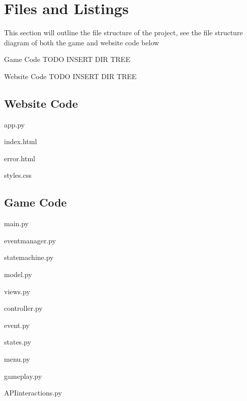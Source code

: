 \documentclass[a4paper, 11pt]{report}
\begin{document}
\section{Files and Listings}
This section will outline the file structure of the project, see the file structure diagram of both the game and website code below

\large{Game Code}
TODO INSERT DIR TREE


\large{Website Code}
TODO INSERT DIR TREE

\lstlistoflistings
\subsection{Website Code}

app.py


index.html


error.html


styles.css



\subsection{Game Code}

main.py


eventmanager.py


statemachine.py


model.py


views.py


controller.py


event.py


states.py


menu.py


gameplay.py


APIinteractions.py

\end{document}

